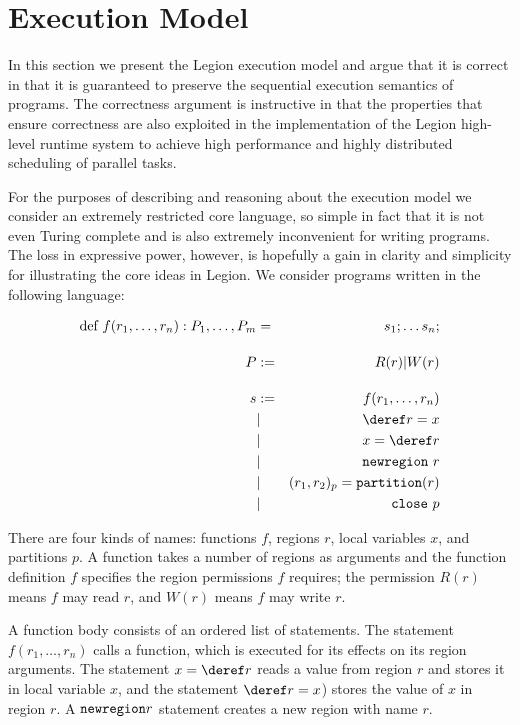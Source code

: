 
\section{Execution Model}
\label{sec:exec}

In this section we present the Legion execution model and argue that
it is correct in that it is guaranteed to preserve the sequential
execution semantics of programs.  The correctness argument is
instructive in that the properties that ensure correctness are also
exploited in the implementation of the Legion high-level runtime
system to achieve high performance and highly distributed scheduling
of parallel tasks.

For the purposes of describing and reasoning about the
execution model we consider an extremely restricted core language, so
simple in fact that it is not even Turing complete and is also extremely
inconvenient for writing programs.  The loss in expressive power, however,
is hopefully a gain in clarity and simplicity for illustrating the core ideas in
Legion.    We consider programs written in the following language:

\begin{eqnarray*}
\mbox{def}\ f(r_1,\ldots,r_n): P_1,\ldots,P_m & = & s_1; \ldots s_n; \\[.15in]
P & := & R(r) | W(r) \\[.15in]
s & := & f(r_1,\ldots,r_n) \\
&| & \deref r = x \\
& | & x = \deref r \\
&| & \mbox{\tt newregion}\ r \\
&| & (r_1, r_2)_{p} = \mbox{\tt partition}(r) \\ 
&| & \mbox{\tt close}\ p 

\end{eqnarray*}

There are four kinds of names: functions $f$, regions $r$, local
variables $x$, and partitions $p$.  A function takes a number of
regions as arguments and the function definition $f$ specifies the
region permissions $f$ requires; the permission $R(r)$ means $f$ may
read $r$, and $W(r)$ means $f$ may write $r$.  

A function body consists of an ordered list of statements.  The statement
$f(r_1,\ldots,r_n)$ calls a function, which is executed for its effects
on its region arguments.  The statement $x = \deref
r$ reads a value from region $r$ and stores it in local variable $x$,
and the statement $\deref r = x$) stores the value of $x$ in region
$r$.  A $\mbox{\tt newregion} r$ statement creates a new region with
name $r$. 

